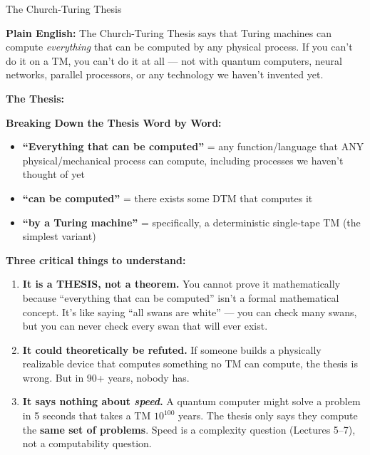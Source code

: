 \documentclass[11pt,a4paper]{article}
\begin{document}
\begin{definitionbox}{The Church-Turing Thesis}

\textbf{Plain English:} The Church-Turing Thesis says that Turing machines can compute \textit{everything} that can be computed by any physical process. If you can't do it on a TM, you can't do it at all --- not with quantum computers, neural networks, parallel processors, or any technology we haven't invented yet.

\textbf{The Thesis:}
\begin{center}
\end{center}

\textbf{Breaking Down the Thesis Word by Word:}
\begin{itemize}[nosep]
\item \textbf{``Everything that can be computed''} = any function/language that ANY physical/mechanical process can compute, including processes we haven't thought of yet
\item \textbf{``can be computed''} = there exists some DTM that computes it
\item \textbf{``by a Turing machine''} = specifically, a deterministic single-tape TM (the simplest variant)
\end{itemize}

\textbf{Three critical things to understand:}

\begin{enumerate}
\item \textbf{It is a THESIS, not a theorem.} You cannot prove it mathematically because ``everything that can be computed'' isn't a formal mathematical concept. It's like saying ``all swans are white'' --- you can check many swans, but you can never check every swan that will ever exist.

\item \textbf{It could theoretically be refuted.} If someone builds a physically realizable device that computes something no TM can compute, the thesis is wrong. But in 90+ years, nobody has.

\item \textbf{It says nothing about \textit{speed}.} A quantum computer might solve a problem in 5 seconds that takes a TM $10^{100}$ years. The thesis only says they compute the \textbf{same set of problems}. Speed is a complexity question (Lectures 5--7), not a computability question.
\end{enumerate}


\end{definitionbox}
\end{document}
